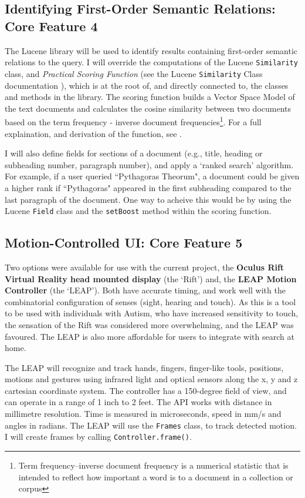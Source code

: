 \documentclass[a4paper, 11pt]{article}
\begin{document}
\begin{justify}
\subsection{Identifying First-Order Semantic Relations: Core Feature 4}\label{apache}
The Lucene library will be used to identify results containing first-order semantic relations to the query. I will override the computations of the Lucene \texttt{Similarity} class, and \textit{Practical Scoring Function} (see the Lucene \texttt{Similarity} Class documentation \cite{similarity}), which is at the root of, and directly connected to, the classes and methods in the library. The scoring function builds a Vector Space Model of the text documents and calculates the cosine similarity between two documents based on the term frequency - inverse document frequencies\footnote{Term frequency–inverse document frequency is a numerical statistic that is intended to reflect how important a word is to a document in a collection or corpus}. For a full explaination, and derivation of the function, see \cite{similarity}. 

I will also define fields for sections of a document (e.g., title, heading or subheading number, paragraph number), and apply a `ranked search' algorithm. For example, if a user queried ``Pythagoras Theorum", a document could be given a higher rank if ``Pythagoras" appeared in the first subheading compared to the last paragraph of the document. One way to acheive this would be by using the Lucene \texttt{Field} class and the \texttt{setBoost} method within the scoring function. 

\subsection{Motion-Controlled UI: Core Feature 5}\label{hardware}
Two options were available for use with the current project, the \textbf{Oculus Rift Virtual Reality head mounted display} (the `Rift') and, the \textbf{LEAP Motion Controller} (the `LEAP'). Both have accurate timing, and work well with the combinatorial configuration of senses (sight, hearing and touch). As this is a tool to be used with individuals with Autism, who have increased sensitivity to touch, the sensation of the Rift was considered more overwhelming, and the LEAP was favoured. The LEAP is also more affordable for users to integrate with search at home. 

The LEAP will recognize and track hands, fingers, finger-like tools, positions, motions and gestures using infrared light and optical sensors along the x, y and z cartesian coordinate system. The controller has a 150-degree field of view, and can operate in a range of 1 inch to 2 feet. The API works with distance in millimetre resolution. Time is measured in microseconds, speed in mm/s and angles in radians. The LEAP will use the \texttt{Frames} class, to track detected motion. I will create frames by calling \texttt{Controller.frame()}.


\end{justify}
\end{document}

